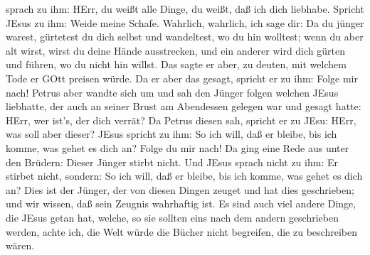 sprach zu ihm: HErr, du weißt alle Dinge, du weißt, daß ich dich
liebhabe. Spricht JEsus zu ihm: Weide meine Schafe. 
Wahrlich, wahrlich, ich sage dir: Da du jünger warest, gürtetest du dich
selbst und wandeltest, wo du hin wolltest; wenn du aber alt wirst, wirst
du deine Hände ausstrecken, und ein anderer wird dich gürten und führen,
wo du nicht hin willst.  Das sagte er aber, zu deuten, mit
welchem Tode er GOtt preisen würde. Da er aber das gesagt, spricht er zu
ihm: Folge mir nach!  Petrus aber wandte sich um und sah
den Jünger folgen welchen JEsus liebhatte, der auch an seiner Brust am
Abendessen gelegen war und gesagt hatte: HErr, wer ist's, der dich
verrät?  Da Petrus diesen sah, spricht er zu JEsu: HErr,
was soll aber dieser?  JEsus spricht zu ihm: So ich will,
daß er bleibe, bis ich komme, was gehet es dich an? Folge du mir nach!
 Da ging eine Rede aus unter den Brüdern: Dieser Jünger
stirbt nicht. Und JEsus sprach nicht zu ihm: Er stirbet nicht, sondern:
So ich will, daß er bleibe, bis ich komme, was gehet es dich an?
 Dies ist der Jünger, der von diesen Dingen zeuget und hat
dies geschrieben; und wir wissen, daß sein Zeugnis wahrhaftig ist.
 Es sind auch viel andere Dinge, die JEsus getan hat,
welche, so sie sollten eins nach dem andern geschrieben werden, achte
ich, die Welt würde die Bücher nicht begreifen, die zu beschreiben
wären.
